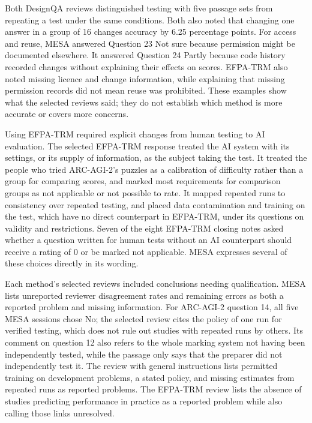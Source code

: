 \documentclass[10pt,conference]{IEEEtran}
\begin{document}
Both DesignQA reviews distinguished testing with five passage sets from repeating a test under the same conditions. Both also noted that changing one answer in a group of 16 changes accuracy by 6.25 percentage points. For access and reuse, MESA answered Question 23 Not sure because permission might be documented elsewhere. It answered Question 24 Partly because code history recorded changes without explaining their effects on scores. EFPA-TRM also noted missing licence and change information, while explaining that missing permission records did not mean reuse was prohibited. These examples show what the selected reviews said; they do not establish which method is more accurate or covers more concerns.

Using EFPA-TRM required explicit changes from human testing to AI evaluation. The selected EFPA-TRM response treated the AI system with its settings, or its supply of information, as the subject taking the test. It treated the people who tried ARC-AGI-2's puzzles as a calibration of difficulty rather than a group for comparing scores, and marked most requirements for comparison groups as not applicable or not possible to rate. It mapped repeated runs to consistency over repeated testing, and placed data contamination and training on the test, which have no direct counterpart in EFPA-TRM, under its questions on validity and restrictions. Seven of the eight EFPA-TRM closing notes asked whether a question written for human tests without an AI counterpart should receive a rating of 0 or be marked not applicable. MESA expresses several of these choices directly in its wording.

Each method's selected reviews included conclusions needing qualification. MESA lists unreported reviewer disagreement rates and remaining errors as both a reported problem and missing information. For ARC-AGI-2 question 14, all five MESA sessions chose No; the selected review cites the policy of one run for verified testing, which does not rule out studies with repeated runs by others. Its comment on question 12 also refers to the whole marking system not having been independently tested, while the passage only says that the preparer did not independently test it. The review with general instructions lists permitted training on development problems, a stated policy, and missing estimates from repeated runs as reported problems. The EFPA-TRM review lists the absence of studies predicting performance in practice as a reported problem while also calling those links unresolved.
\end{document}
